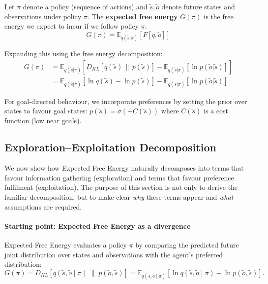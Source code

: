 \documentclass[a4paper, twoside]{article}
\begin{document}
Let $\pi$ denote a policy (sequence of actions) and $\tilde{s}, \tilde{o}$ denote future states and observations under policy $\pi$.
The \textbf{expected free energy} $G(\pi)$ is the free energy we expect to incur if we follow policy $\pi$:
%
\begin{equation}
G(\pi) = \mathbb{E}_{q(\tilde{s}|\pi)}[F[q,\tilde{o}]]
\end{equation}

Expanding this using the free energy decomposition:
%
\begin{align}
G(\pi) &= \mathbb{E}_{q(\tilde{s}|\pi)}\left[D_{KL}[q(\tilde{s})\,\|\,p(\tilde{s})] - \mathbb{E}_{q(\tilde{s}|\pi)}[\ln p(\tilde{o}|\tilde{s})]\right] \nonumber \\
&= \mathbb{E}_{q(\tilde{s}|\pi)}\left[\ln q(\tilde{s}) - \ln p(\tilde{s})\right] - \mathbb{E}_{q(\tilde{s}|\pi)}[\ln p(\tilde{o}|\tilde{s})]
\end{align}

For goal-directed behaviour, we incorporate preferences by setting the prior over states to favour goal states: $p(\tilde{s}) = \sigma(-C(\tilde{s}))$ where $C(\tilde{s})$ is a cost function (low near goals).

\subsection{Exploration--Exploitation Decomposition}

We now show how Expected Free Energy naturally decomposes into terms that favour
information gathering (exploration) and terms that favour preference fulfilment
(exploitation). The purpose of this section is not only to derive the familiar
decomposition, but to make clear \emph{why} these terms appear and \emph{what}
assumptions are required.

\paragraph{Starting point: Expected Free Energy as a divergence}

Expected Free Energy evaluates a policy $\pi$ by comparing the predicted future
joint distribution over states and observations with the agent's preferred
distribution:
\begin{equation}
G(\pi)
=
D_{KL}\!\left[
q(\tilde{s},\tilde{o}\mid\pi)
\;\|\;
p(\tilde{o},\tilde{s})
\right]
=
\mathbb{E}_{q(\tilde{s},\tilde{o}\mid\pi)}
\!\left[
\ln q(\tilde{s},\tilde{o}\mid\pi)
-
\ln p(\tilde{o},\tilde{s})
\right].
\end{equation}
\end{document}
